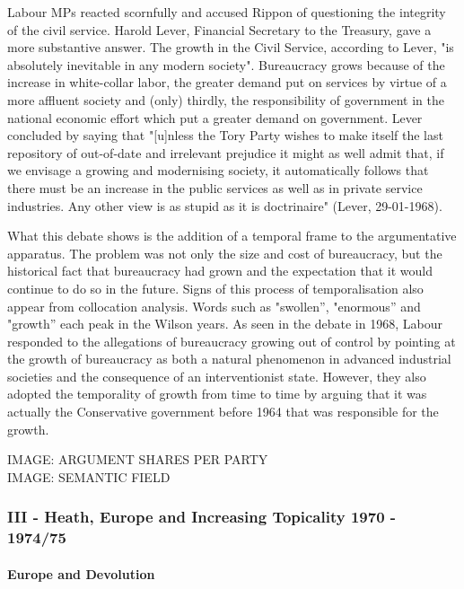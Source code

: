 \documentclass[
]{article}
\begin{document}
Labour MPs reacted scornfully and accused Rippon of questioning the
integrity of the civil service. Harold Lever, Financial Secretary to the
Treasury, gave a more substantive answer. The growth in the Civil
Service, according to Lever, "is absolutely inevitable in any modern
society". Bureaucracy grows because of the increase in white-collar
labor, the greater demand put on services by virtue of a more affluent
society and (only) thirdly, the responsibility of government in the
national economic effort which put a greater demand on government. Lever
concluded by saying that "{[}u{]}nless the Tory Party wishes to make
itself the last repository of out-of-date and irrelevant prejudice it
might as well admit that, if we envisage a growing and modernising
society, it automatically follows that there must be an increase in the
public services as well as in private service industries. Any other view
is as stupid as it is doctrinaire" (Lever, 29-01-1968).

What this debate shows is the addition of a temporal frame to the
argumentative apparatus. The problem was not only the size and cost of
bureaucracy, but the historical fact that bureaucracy had grown and the
expectation that it would continue to do so in the future. Signs of this
process of temporalisation also appear from collocation analysis. Words
such as "swollen'', "enormous'' and "growth'' each peak in the Wilson
years. As seen in the debate in 1968, Labour responded to the
allegations of bureaucracy growing out of control by pointing at the
growth of bureaucracy as both a natural phenomenon in advanced
industrial societies and the consequence of an interventionist state.
However, they also adopted the temporality of growth from time to time
by arguing that it was actually the Conservative government before 1964
that was responsible for the growth.

IMAGE: ARGUMENT SHARES PER PARTY\\
IMAGE: SEMANTIC FIELD

\hypertarget{header-n52}{%
\subsubsection{III - Heath, Europe and Increasing Topicality 1970 -
1974/75}\label{header-n52}}

\hypertarget{header-n53}{%
\paragraph{Europe and Devolution}\label{header-n53}}
\end{document}

